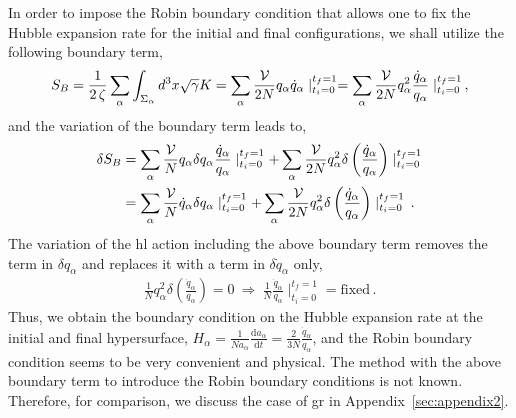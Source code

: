 \documentclass[superscriptaddress,aps,preprintnumbers,nofootinbib]{revtex4-2}
\begin{document}
In order to impose the Robin boundary condition that allows one to fix the Hubble expansion rate for the initial and final configurations, we shall utilize the following boundary term, 
\begin{equation}\label{eq:robin-boundary-term}
S_B=\frac{1}{2\, \zeta}\sum_{\alpha} \int_{\Sigma_{\alpha}}d^3x \sqrt{\gamma}K=
\sum_{\alpha}\frac{{\cal V}}{2N}q_{\alpha}\dot{q}_{\alpha}\mid^{t_{f}=1}_{t_{i}=0}= \sum_{\alpha}\frac{{\cal V}}{2N}q_{\alpha}^2
\frac{\dot{q}_{\alpha}}{q_{\alpha}}\mid^{t_{f}=1}_{t_{i}=0}\,, 
\end{equation}
and the variation of the boundary term leads to, 
\begin{align}
\delta S_B&=\sum_{\alpha}\frac{{\cal V}}{N}q_{\alpha}\delta q_{\alpha} \frac{\dot{q}_{\alpha}}{q_{\alpha}}\mid^{t_{f}=1}_{t_{i}=0} + \sum_{\alpha}\frac{{\cal V}}{2N}q_{\alpha}^2\delta \left(\frac{\dot{q}_{\alpha}}{q_{\alpha}} \right)
\mid^{t_{f}=1}_{t_{i}=0}\notag \\
&= \sum_{\alpha}\frac{{\cal V}}{N}\dot{q}_{\alpha}\delta q_{\alpha}\mid^{t_{f}=1}_{t_{i}=0} + \sum_{\alpha}\frac{{\cal V}}{2N}q_{\alpha}^2\delta \left(\frac{\dot{q}_{\alpha}}{q_{\alpha}} \right)
\mid^{t_{f}=1}_{t_{i}=0}\,.
\end{align}
The variation of the \ac{hl} action including the above boundary term removes the term in $\delta q_{\alpha}$ and replaces it with a term in $\delta \dot{q}_{\alpha}$ only,
\begin{align}
\frac{1}{N}q_{\alpha}^2\delta \left(\frac{\dot{q}_{\alpha}}{q_{\alpha}} \right) = 0\ 
\Longrightarrow \ \frac{1}{N}\frac{\dot{q}_{\alpha}}{q_{\alpha}}\mid^{t_{f}=1}_{t_{i}=0} = \textrm{fixed} \,. 
\end{align}
Thus, we obtain the boundary condition on the Hubble expansion rate at the initial and final hypersurface, ${H}_{\alpha}=\frac{1}{Na_{\alpha}}\frac{\mathrm{d} a_{\alpha}}{\mathrm{d} t}=\frac{2}{3N}\frac{\dot{q}_{\alpha}}{q_{\alpha}}$, and the Robin boundary condition seems to be very convenient and physical. The method with the above boundary term to introduce the Robin boundary conditions is not known. Therefore, for comparison, we discuss the case of \ac{gr} in Appendix~\ref{sec:appendix2}.
\end{document}

